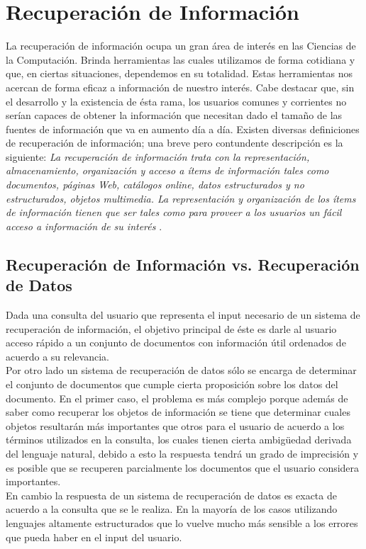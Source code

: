 \section{Recuperación de Información}
	La recuperación de información ocupa un gran área de interés en las Ciencias de la Computación. Brinda herramientas las cuales utilizamos de forma cotidiana y que, en ciertas situaciones, dependemos en su totalidad. Estas herramientas nos acercan de forma eficaz a información de nuestro interés. Cabe destacar que, sin el desarrollo y la existencia de ésta rama, los usuarios comunes y corrientes no serían capaces de obtener la información que necesitan dado el tamaño de las fuentes de información que va en aumento día a día. Existen diversas definiciones de recuperación de información; una breve pero contundente descripción es la siguiente: \textit{La recuperación de información trata con la representación, almacenamiento, organización y acceso a ítems de información tales como documentos, páginas Web, catálogos online, datos estructurados y no estructurados, objetos multimedia. La representación y organización de los ítems de información tienen que ser tales como para proveer a los usuarios un fácil acceso a información de su interés} \cite{baeza1999}.
	
	\subsection{Recuperación de Información vs. Recuperación de Datos}
	Dada una consulta del usuario que representa el input necesario de un sistema de recuperación de información, el objetivo principal de éste es darle al usuario acceso rápido a un conjunto de documentos con información útil ordenados de acuerdo a su relevancia.  \\
	Por otro lado un sistema de recuperación de datos sólo se encarga de determinar el conjunto de documentos que cumple cierta proposición sobre los datos del documento.
	En el primer caso, el problema es más complejo porque además de saber como recuperar los objetos de información se tiene que determinar cuales objetos resultarán más importantes que otros para el usuario de acuerdo a los términos utilizados en la consulta, los cuales tienen cierta ambigüedad derivada del lenguaje natural, debido a esto la respuesta tendrá un grado de imprecisión y es posible que se recuperen parcialmente los documentos que el usuario considera importantes. \\
	En cambio la respuesta de un sistema de recuperación de datos es exacta de acuerdo a la consulta que se le realiza. En la mayoría de los casos utilizando lenguajes altamente estructurados que lo vuelve mucho más sensible a los errores que pueda haber en el input del usuario.
	

